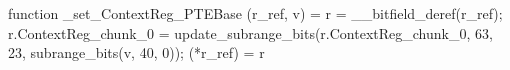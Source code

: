 function _set_ContextReg_PTEBase (r_ref, v) = {
    r = __bitfield_deref(r_ref);
    r.ContextReg_chunk_0 = update_subrange_bits(r.ContextReg_chunk_0, 63, 23, subrange_bits(v, 40, 0));
    (*r_ref) = r
}
